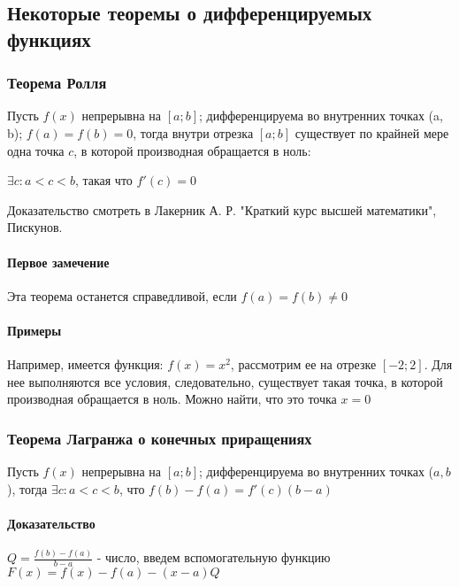 \documentclass{article}
\begin{document}
\subsection{Некоторые теоремы о дифференцируемых функциях}

\subsubsection{Теорема Ролля}

\begin{flushleft}

Пусть $f(x)$ непрерывна на $[ a; b ]$; дифференцируема во внутренних точках (a, b); $f(a) = f(b) = 0$, тогда внутри отрезка $[ a; b ]$ существует по крайней мере одна точка $c$, в которой производная обращается в ноль:

$\exists c: a < c < b$, такая что $f'(c) = 0$

Доказательство смотреть в Лакерник А. Р. "Краткий курс высшей математики", Пискунов.

\paragraph{Первое замечение} Эта теорема останется справедливой, если $f(a) = f(b) \ne 0$

\paragraph{Примеры}

Например, имеется функция: $f(x) = x^2$, рассмотрим ее на отрезке $[-2; 2]$. Для нее выполняются все условия, следовательно, существует такая точка, в которой производная обращается в ноль. Можно найти, что это точка $x = 0$

\subsubsection{Теорема Лагранжа о конечных приращениях}

Пусть $f(x)$ непрерывна на $[ a; b ]$; дифференцируема во внутренних точках ($a, b$), тогда $\exists c: a < c < b$, что $f(b) - f(a) = f'(c)(b-a)$

\paragraph{Доказательство}

$Q = \frac{f(b) - f(a)}{b - a}$ - число, введем вспомогательную функцию $F(x) = f(x) - f(a) - (x - a)Q$


\end{flushleft}
\end{document}

